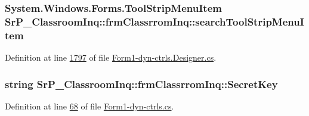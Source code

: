 \hypertarget{class_sr_p___classroom_inq_1_1frm_classrrom_inq_aa54fbd91dddb42716ec00341ee7ac713}{
\subsubsection[{search\-Tool\-Strip\-Menu\-Item}]{\setlength{\rightskip}{0pt plus 5cm}\-System.\-Windows.\-Forms.\-Tool\-Strip\-Menu\-Item {\bf \-Sr\-P\-\_\-\-Classroom\-Inq\-::frm\-Classrrom\-Inq\-::search\-Tool\-Strip\-Menu\-Item}}}
\label{class_sr_p___classroom_inq_1_1frm_classrrom_inq_aa54fbd91dddb42716ec00341ee7ac713}


\-Definition at line \hyperlink{_form1-dyn-ctrls_8_designer_8cs_source_l01797}{1797} of file \hyperlink{_form1-dyn-ctrls_8_designer_8cs_source}{\-Form1-\/dyn-\/ctrls.\-Designer.\-cs}.

\hypertarget{class_sr_p___classroom_inq_1_1frm_classrrom_inq_ae3ddacd233e71c710d89e12401af37c1}{
\subsubsection[{\-Secret\-Key}]{\setlength{\rightskip}{0pt plus 5cm}string {\bf \-Sr\-P\-\_\-\-Classroom\-Inq\-::frm\-Classrrom\-Inq\-::\-Secret\-Key}}}
\label{class_sr_p___classroom_inq_1_1frm_classrrom_inq_ae3ddacd233e71c710d89e12401af37c1}


\-Definition at line \hyperlink{_form1-dyn-ctrls_8cs_source_l00068}{68} of file \hyperlink{_form1-dyn-ctrls_8cs_source}{\-Form1-\/dyn-\/ctrls.\-cs}.

